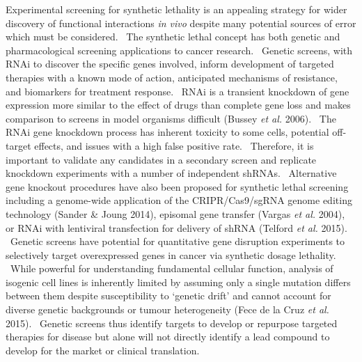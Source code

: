 Experimental screening for synthetic lethality is an appealing strategy for wider discovery of functional interactions \textit{in vivo} despite many potential sources of error which must be considered. \ The synthetic lethal concept has both genetic and pharmacological screening applications to cancer research. \ Genetic screens, with RNAi to discover the specific genes involved, inform development of targeted therapies with a known mode of action, anticipated mechanisms of resistance, and biomarkers for treatment response. \ RNAi is a transient knockdown of gene expression more similar to the effect of drugs than complete gene loss and makes comparison to screens in model organisms difficult (Bussey\textit{ et al.} 2006). \ The RNAi gene knockdown process has inherent toxicity to some cells, potential off-target effects, and issues with a high false positive rate. \ Therefore, it is important to validate any candidates in a secondary screen and replicate knockdown experiments with a number of independent shRNAs. \ Alternative gene knockout procedures have also been proposed for synthetic lethal screening including a genome-wide application of the CRIPR/Cas9/sgRNA genome editing technology (Sander \& Joung 2014), episomal gene transfer (Vargas\textit{ et al.} 2004), or RNAi with lentiviral transfection for delivery of shRNA (Telford\textit{ et al.} 2015). \ Genetic screens have potential for quantitative gene disruption experiments to selectively target overexpressed genes in cancer via synthetic dosage lethality. \ While powerful for understanding fundamental cellular function, analysis of isogenic cell lines is inherently limited by assuming only a single mutation differs between them despite susceptibility to {\textquoteleft}genetic drift{\textquoteright} and cannot account for diverse genetic backgrounds or tumour heterogeneity (Fece de la Cruz\textit{ et al.} 2015). \ Genetic screens thus identify targets to develop or repurpose targeted therapies for disease but alone will not directly identify a lead compound to develop for the market or clinical translation. \  


